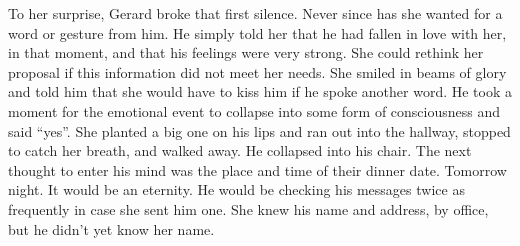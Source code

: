 

To her surprise, Gerard broke that first silence.  Never since has she
wanted for a word or gesture from him.  He simply told her that he had
fallen in love with her, in that moment, and that his feelings were
very strong.  She could rethink her proposal if this information did
not meet her needs.  She smiled in beams of glory and told him that
she would have to kiss him if he spoke another word.  He took a moment
for the emotional event to collapse into some form of consciousness
and said ``yes''.  She planted a big one on his lips and ran out into
the hallway, stopped to catch her breath, and walked away.  He
collapsed into his chair.  The next thought to enter his mind was the
place and time of their dinner date.  Tomorrow night.  It would be an
eternity.  He would be checking his messages twice as frequently in
case she sent him one.  She knew his name and address, by office, but
he didn't yet know her name.

\bye

